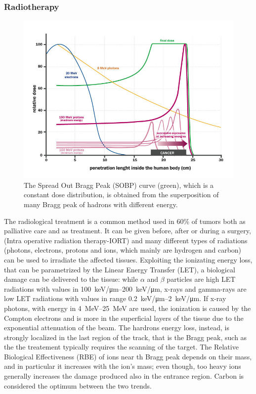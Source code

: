         \subsubsection{Radiotherapy}
            \begin{figure}
                \centering
                \includegraphics[width=.7\linewidth]{figures/pixel_detectors_usage/Bragg-Peak.png}
                \caption{The Spread Out Bragg Peak (SOBP) curve (green), which is a constant dose distribution, is obtained from the superposition of many Bragg peak of hadrons with different energy.}
                \label{fig:Bragg-peak}
            \end{figure}
            The radiological treatment is a common method used in 60\% of tumors both as palliative care and as treatment. It can be given before, after or during a surgery, (Intra operative radiation therapy-IORT) and many different types of radiations (photons, electrons, protons and ions, which mainly are hydrogen and carbon) can be used to irradiate the affected tissues.
            Exploiting the ionizating energy loss, that can be parametrized by the Linear Energy Transfer (LET), a biological damage can be delivered to the tissue: while $\alpha$ and $\beta$ particles are high LET radiations with values in \SIrange{100}{200}{keV/\um}, x-rays and gamma-rays are low LET radiations with values in range \SIrange{0.2}{2}{keV/\um}.
            If x-ray photons, with energy in \SIrange{4}{25}{MeV} are used, the ionization is caused by the Compton electrons and is more in the superficial layers of the tissue due to the exponential attenuation of the beam. 
            The hardrons energy loss, instead, is strongly localized in the last region of the track, that is the Bragg peak, such as the the treatement typically requires the scanning of the target. The Relative Biological Effectiveness (RBE) of ions near th Bragg peak depends on their mass, and in particular it increases with the ion's mass; even though, too heavy ions generally increases the damage produced also in the entrance region. Carbon is considered the optimum between the two trends.
            
